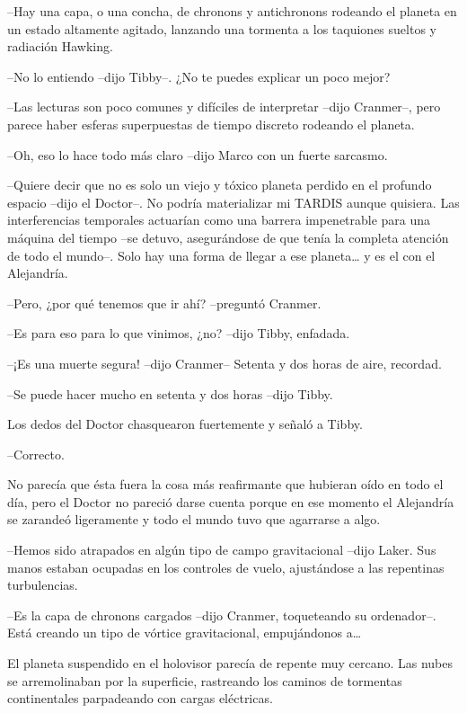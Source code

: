 {--Hay una capa, o una concha, de chronons y antichronons rodeando el
 planeta en un estado altamente agitado, lanzando una tormenta a los
taquiones sueltos y radiación Hawking.}

{--No lo entiendo --dijo Tibby--. ¿No te puedes explicar un poco mejor?}

{--Las lecturas son poco comunes y difíciles de interpretar --dijo
 Cranmer--, pero parece haber esferas superpuestas de tiempo discreto
rodeando el planeta.}

{--Oh, eso lo hace todo más claro --dijo Marco con un fuerte sarcasmo.}

{--Quiere decir que no es solo un viejo y tóxico planeta perdido en el
 profundo espacio --dijo el Doctor--. No podría materializar mi TARDIS
 aunque quisiera. Las interferencias temporales actuarían como una
 barrera impenetrable para una máquina del tiempo --se detuvo,
 asegurándose de que tenía la completa atención de todo el mundo--. Solo
 hay una forma de llegar a ese planeta\ldots{} y es el con el
Alejandría.}

{--Pero, ¿por qué tenemos que ir ahí? --preguntó Cranmer.}

{--Es para eso para lo que vinimos, ¿no? --dijo Tibby, enfadada.}

{--¡Es una muerte segura! --dijo Cranmer-- Setenta y dos horas de aire,
recordad.}

{--Se puede hacer mucho en setenta y dos horas --dijo Tibby.}

{Los dedos del Doctor chasquearon fuertemente y señaló a Tibby.}

{--Correcto.}

{No parecía que ésta fuera la cosa más reafirmante que hubieran oído en
 todo el día, pero el Doctor no pareció darse cuenta porque en ese
 momento el Alejandría se zarandeó ligeramente y todo el mundo tuvo que
agarrarse a algo.}

{--Hemos sido atrapados en algún tipo de campo gravitacional --dijo
 Laker. Sus manos estaban ocupadas en los controles de vuelo, ajustándose
a las repentinas turbulencias.}

{--Es la capa de chronons cargados --dijo Cranmer, toqueteando su
 ordenador--. Está creando un tipo de vórtice gravitacional, empujándonos
 a\ldots{}}

{El planeta suspendido en el holovisor parecía de repente muy cercano.
 Las nubes se arremolinaban por la superficie, rastreando los caminos de
tormentas continentales parpadeando con cargas eléctricas.}

